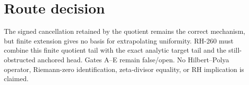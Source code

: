 \documentclass[11pt]{article}
\theoremstyle{remark}
\begin{document}
\section{Route decision}

The signed cancellation retained by the quotient remains the correct
mechanism, but finite extension gives no basis for extrapolating uniformity.
RH-260 must combine this finite quotient tail with the exact analytic target
tail and the still-obstructed anchored head.  Gates A--E remain false/open.
No Hilbert--Polya operator, Riemann-zero identification, zeta-divisor equality,
or RH implication is claimed.



\end{document}
